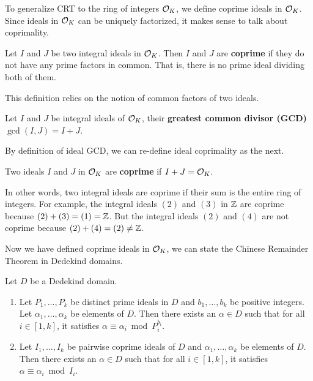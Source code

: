 \documentclass[../main.tex]{subfiles}
\begin{document}
To generalize CRT to the ring of integers $\mathcal{O}_K$, we define coprime ideals in $\mathcal{O}_K$. Since ideals in $\mathcal{O}_K$ can be uniquely factorized, it makes sense to talk about coprimality.

\begin{definition}
Let $I$ and $J$ be two integral ideals in $\mathcal{O}_K$. Then $I$ and $J$ are \textbf{coprime} if they do
\reversemarginpar
{}
not have any prime factors in common. That is, there is no prime ideal dividing both of them. 
\end{definition}

This definition relies on the notion of common factors of two ideals. 

\begin{definition}
\reversemarginpar
{}
Let $I$ and $J$ be integral ideals of $\mathcal{O}_K$, their \textbf{greatest common divisor (GCD)} $\gcd(I, J) = I+J$. 
\end{definition}

By definition of ideal GCD, we can re-define ideal coprimality as the next. 

\begin{definition}
Two ideals $I$ and $J$ in $\mathcal{O}_K$ are \textbf{coprime} if $I+J=\mathcal{O}_K$.
\end{definition}
In other words, two integral ideals are coprime if their sum is the entire ring of integers.
For example, the integral ideals $(2)$ and $(3)$ in $\mathbb{Z}$ are coprime because $(2)+(3)=(1)=\mathbb{Z}$. But the integral ideals $(2)$ and $(4)$ are not coprime because $(2)+(4)=(2) \neq \mathbb{Z}$. 

Now we have defined coprime ideals in $\mathcal{O}_K$, we can state the Chinese Remainder Theorem in Dedekind domains. 


\begin{theorem}
\reversemarginpar
{}
Let $D$ be a Dedekind domain.
\begin{enumerate}
    \item Let $P_1,\dots, P_k$ be distinct prime ideals in $D$ and $b_1,\dots, b_k$ be positive integers. Let $\alpha_1,\dots,\alpha_k$ be elements of $D$. Then there exists an $\alpha \in  D$ such that  for all $i \in [1,k]$, it satisfies $\alpha \equiv \alpha_i \bmod P_i^{b_i}$.
    
    \item Let $I_1,\dots, I_k$ be pairwise coprime ideals of $D$ and $\alpha_1, \dots, \alpha_k$ be elements of $D$. Then there exists an $\alpha \in D$ such that for all $i \in [1, k]$, it satisfies $\alpha \equiv \alpha_i \bmod I_i$.
\end{enumerate} 

\end{theorem}
\end{document}
